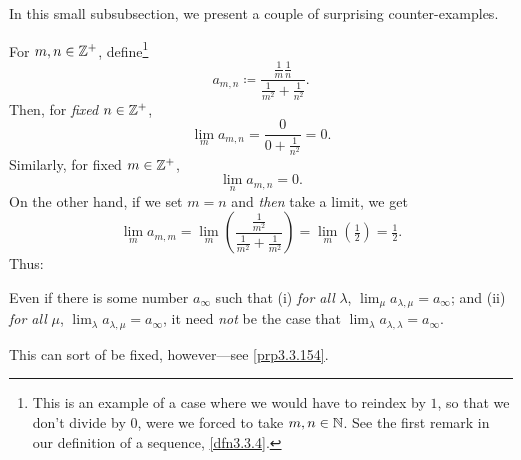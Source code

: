 In this small subsubsection, we present a couple of surprising counter-examples.
\begin{exm}\label{exm3.3.73}
For $m,n\in \mathbb{Z} ^+$, define\footnote{This is an example of a case where we would have to reindex by $1$, so that we don't divide by $0$, were we forced to take $m,n\in \mathbb{N}$.  See the first remark in our definition of a sequence, \cref{dfn3.3.4}.}
\begin{equation}
a_{m,n}\coloneqq \frac{\tfrac{1}{m}\tfrac{1}{n}}{\tfrac{1}{m^2}+\tfrac{1}{n^2}}.
\end{equation}
Then, for \emph{fixed} $n\in \mathbb{Z} ^+$,
\begin{equation}
\lim _ma_{m,n}=\frac{0}{0+\tfrac{1}{n^2}}=0.
\end{equation}
Similarly, for fixed $m\in \mathbb{Z} ^+$,
\begin{equation}
\lim _na_{m,n}=0.
\end{equation}
On the other hand, if we set $m=n$ and \emph{then} take a limit, we get
\begin{equation}
\lim _ma_{m,m}=\lim _m\left( \frac{\tfrac{1}{m^2}}{\tfrac{1}{m^2}+\tfrac{1}{m^2}}\right) =\lim _m(\tfrac{1}{2})=\tfrac{1}{2}.
\end{equation}
Thus:
\begin{textequation}
Even if there is some number $a_\infty$ such that (i) \emph{for all} $\lambda$, $\lim _\mu a_{\lambda ,\mu}=a_\infty$; and (ii) \emph{for all} $\mu$, $\lim _\lambda a_{\lambda ,\mu}=a_\infty$, it need \emph{not} be the case that $\lim _\lambda a_{\lambda ,\lambda}=a_\infty$.
\end{textequation}
This can sort of be fixed, however---see \cref{prp3.3.154}.
\end{exm}
